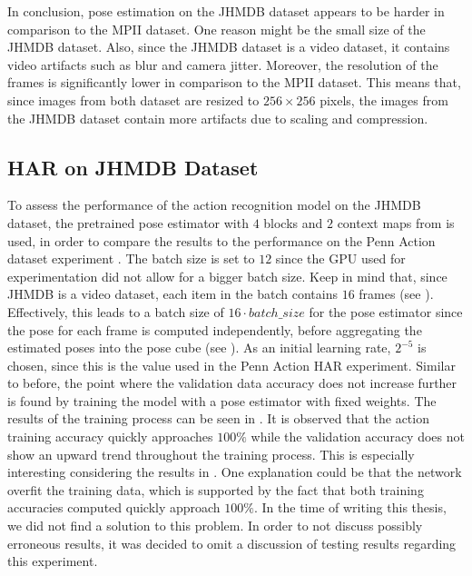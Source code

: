 In conclusion, pose estimation on the JHMDB dataset appears to be harder in comparison to the MPII dataset.
One reason might be the small size of the JHMDB dataset.
Also, since the JHMDB dataset is a video dataset, it contains video artifacts such as blur and camera jitter.
Moreover, the resolution of the frames is significantly lower in comparison to the MPII dataset.
This means that, since images from both dataset are resized to $256 \times 256$ pixels, the images from the JHMDB dataset contain more artifacts due to scaling and compression.

\subsection{HAR on JHMDB Dataset}
To assess the performance of the action recognition model on the JHMDB dataset, the pretrained pose estimator with $4$ blocks and $2$ context maps from  is used, in order to compare the results to the performance on the Penn Action dataset experiment .
The batch size is set to $12$ since the GPU used for experimentation did not allow for a bigger batch size.
Keep in mind that, since JHMDB is a video dataset, each item in the batch contains $16$ frames (see ).
Effectively, this leads to a batch size of $16 \cdot batch\_size$ for the pose estimator since the pose for each frame is computed independently, before aggregating the estimated poses into the pose cube (see ).
As an initial learning rate, $2^{-5}$ is chosen, since this is the value used in the Penn Action HAR experiment.
Similar to before, the point where the validation data accuracy does not increase further is found by training the model with a pose estimator with fixed weights.
The results of the training process can be seen in .
It is observed that the action training accuracy quickly approaches $100\%$ while the validation accuracy does not show an upward trend throughout the training process.
This is especially interesting considering the results in .
One explanation could be that the network overfit the training data, which is supported by the fact that both training accuracies computed quickly approach $100\%$.
In the time of writing this thesis, we did not find a solution to this problem.
In order to not discuss possibly erroneous results, it was decided to omit a discussion of testing results regarding this experiment.

